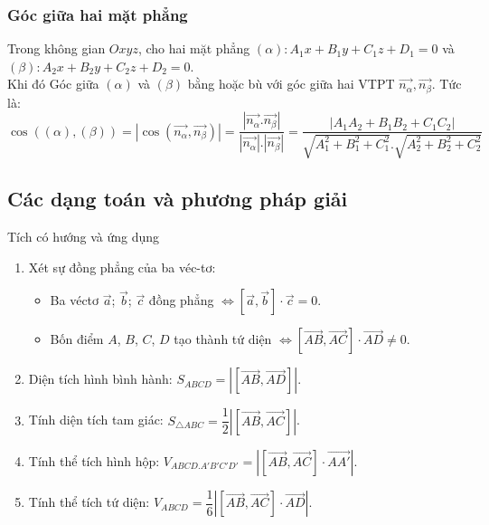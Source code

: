 \begin{tomtat}
\subsubsection{Góc giữa hai mặt phẳng}
Trong không gian $Oxyz$, cho hai mặt phẳng $\left(\alpha\right):A_1x+B_1y+C_1z+D_1=0$ và $\left(\beta\right):A_2x+B_2y+C_2z+D_2=0 $.\\
	Khi đó Góc giữa $\left(\alpha\right)$ và $\left(\beta\right)$ bằng hoặc bù với góc giữa hai VTPT $\overrightarrow{n_{\alpha}},\overrightarrow{n_{\beta}}$. Tức là:\\
	$$\boxed{ \cos\left(\left(\alpha\right),\left(\beta\right)\right)=\left|\cos\left(\overrightarrow{n_{\alpha}},\overrightarrow{n_\beta}\right)\right|=\dfrac{\left|\overrightarrow{n_{\alpha}}.\overrightarrow{n_{\beta}}\right|}{\left|\overrightarrow{n_{\alpha}}\right|.\left|\overrightarrow{n_{\beta}}\right|}=\dfrac{\left|A_1A_2+B_1B_2+C_1C_2\right|}{\sqrt{A_1^2+B_1^2+C_1^2}.\sqrt{A_2^2+B_2^2+C_2^2}}}$$
	
\end{tomtat}


\subsection{Các dạng toán và phương pháp giải}
\begin{dang}{Tích có hướng và ứng dụng}
	\begin{enumerate}
		\item Xét sự đồng phẳng của ba véc-tơ:
		\begin{itemize}
			\item Ba véctơ $\vec{a}$; $\vec{b}$; $\vec{c}$ đồng phẳng $\Leftrightarrow \left[ \vec{a},\vec{b} \right]\cdot \vec{c}=0$.
			\item Bốn điểm $A$, $B$, $C$, $D$ tạo thành tứ diện $\Leftrightarrow \left[ \vec{AB},\vec{AC} \right]\cdot \vec{AD}\ne 0$.
		\end{itemize}
		\item Diện tích hình bình hành: $S_{ABCD}=\left| \left[ \vec{AB},\vec{AD} \right] \right|$.
		\item Tính diện tích tam giác: $S_{\triangle ABC}=\dfrac{1}{2}\left| \left[ \vec{AB},\vec{AC} \right] \right|$.
		\item Tính thể tích hình hộp: $V_{ABCD.A'B'C'D'}=\left| \left[ \vec{AB},\vec{AC} \right]\cdot\vec{AA'} \right|$.
		\item Tính thể tích tứ diện: $V_{ABCD}=\dfrac{1}{6}\left| \left[ \vec{AB},\vec{AC} \right]\cdot \vec{AD} \right|$.
	\end{enumerate}
\end{dang}
